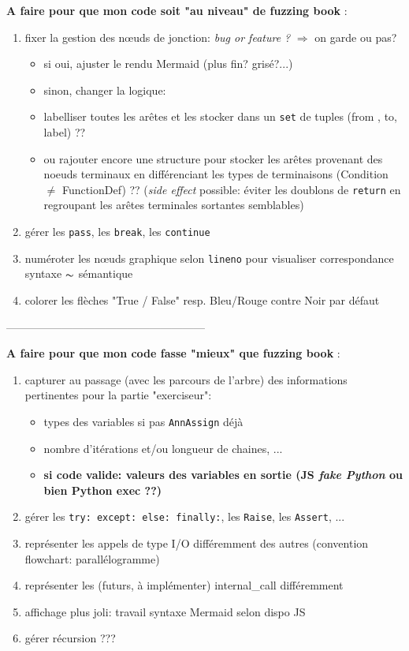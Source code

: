 \documentclass[11pt,a4paper]{article}
\begin{document}
\textbf{A faire pour que mon code soit "au niveau" de fuzzing book} : 
\begin{enumerate}
    \item fixer la gestion des nœuds de jonction: \textit{bug or feature ?} $\Longrightarrow$ on garde ou pas? \begin{itemize}
    \item si oui, ajuster le rendu Mermaid (plus fin? grisé?...)
    \item sinon, changer la logique: 
    \item labelliser toutes les arêtes et les stocker dans un \texttt{set} de tuples (from , to, label) ??
    \item ou rajouter encore une structure pour stocker les arêtes provenant des noeuds terminaux en différenciant les types de terminaisons (Condition $\neq$ FunctionDef) ?? (\textit{side effect} possible: éviter les doublons de \texttt{return} en regroupant les arêtes terminales sortantes semblables)
    \end{itemize}
    \item gérer les \texttt{pass}, les \texttt{break}, les \texttt{continue}
    \item numéroter les nœuds graphique selon \texttt{lineno} pour visualiser correspondance syntaxe $\thicksim$ sémantique
    \item colorer les flèches "True / False" resp. Bleu/Rouge contre Noir par défaut
\end{enumerate}

------------------------------------------------------

\textbf{A faire pour que mon code fasse "mieux" que fuzzing book} : 
\begin{enumerate}
    \item capturer au passage (avec les parcours de l'arbre) des informations pertinentes pour la partie "exerciseur": \begin{itemize}
        \item types des variables si pas \texttt{AnnAssign} déjà
        \item nombre d'itérations et/ou longueur de chaines, ...
        \item \textbf{si code valide: valeurs des variables en sortie (JS \textit{fake Python} ou bien Python exec ??)}
    \end{itemize}
    \item gérer les \texttt{try: except: else: finally:}, les \texttt{Raise}, les \texttt{Assert}, ...
    \item représenter les appels de type I/O différemment des autres (convention flowchart: parallélogramme)
    \item représenter les (futurs, à implémenter) internal\_call différemment
    \item affichage plus joli: travail syntaxe Mermaid selon dispo JS
    \item gérer récursion ???
\end{enumerate}
\end{document}
